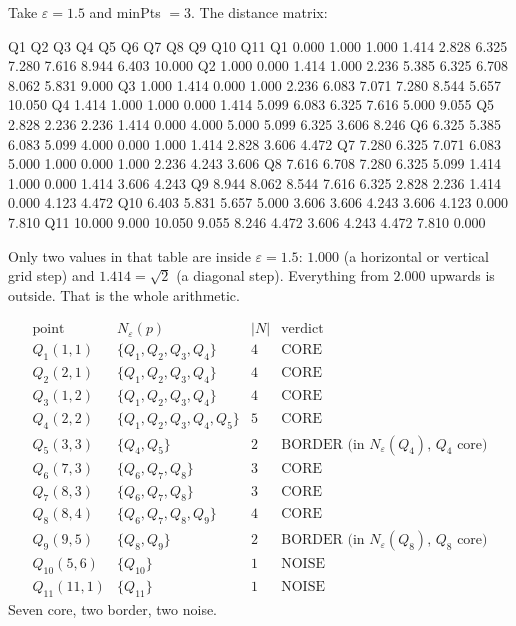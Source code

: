\documentclass[11pt]{article}
\begin{document}
Take $\varepsilon = 1.5$ and minPts $= 3$. The distance matrix:

\begin{codeout}
          Q1     Q2     Q3     Q4     Q5     Q6     Q7     Q8     Q9    Q10    Q11
  Q1   0.000  1.000  1.000  1.414  2.828  6.325  7.280  7.616  8.944  6.403 10.000
  Q2   1.000  0.000  1.414  1.000  2.236  5.385  6.325  6.708  8.062  5.831  9.000
  Q3   1.000  1.414  0.000  1.000  2.236  6.083  7.071  7.280  8.544  5.657 10.050
  Q4   1.414  1.000  1.000  0.000  1.414  5.099  6.083  6.325  7.616  5.000  9.055
  Q5   2.828  2.236  2.236  1.414  0.000  4.000  5.000  5.099  6.325  3.606  8.246
  Q6   6.325  5.385  6.083  5.099  4.000  0.000  1.000  1.414  2.828  3.606  4.472
  Q7   7.280  6.325  7.071  6.083  5.000  1.000  0.000  1.000  2.236  4.243  3.606
  Q8   7.616  6.708  7.280  6.325  5.099  1.414  1.000  0.000  1.414  3.606  4.243
  Q9   8.944  8.062  8.544  7.616  6.325  2.828  2.236  1.414  0.000  4.123  4.472
  Q10  6.403  5.831  5.657  5.000  3.606  3.606  4.243  3.606  4.123  0.000  7.810
  Q11 10.000  9.000 10.050  9.055  8.246  4.472  3.606  4.243  4.472  7.810  0.000
\end{codeout}

Only two values in that table are inside $\varepsilon = 1.5$: $1.000$ (a
horizontal or vertical grid step) and $1.414 = \sqrt{2}$ (a diagonal step).
Everything from $2.000$ upwards is outside. That is the whole arithmetic.

\begin{worked}
\[
\begin{array}{llrl}
  \text{point} & N_\varepsilon(p) & |N| & \text{verdict}\\[2pt]
  Q_1(1,1) & \{Q_1,Q_2,Q_3,Q_4\} & 4 & \text{CORE}\\
  Q_2(2,1) & \{Q_1,Q_2,Q_3,Q_4\} & 4 & \text{CORE}\\
  Q_3(1,2) & \{Q_1,Q_2,Q_3,Q_4\} & 4 & \text{CORE}\\
  Q_4(2,2) & \{Q_1,Q_2,Q_3,Q_4,Q_5\} & 5 & \text{CORE}\\
  Q_5(3,3) & \{Q_4,Q_5\} & 2 & \text{BORDER (in } N_\varepsilon(Q_4)
     \text{, } Q_4 \text{ core)}\\
  Q_6(7,3) & \{Q_6,Q_7,Q_8\} & 3 & \text{CORE}\\
  Q_7(8,3) & \{Q_6,Q_7,Q_8\} & 3 & \text{CORE}\\
  Q_8(8,4) & \{Q_6,Q_7,Q_8,Q_9\} & 4 & \text{CORE}\\
  Q_9(9,5) & \{Q_8,Q_9\} & 2 & \text{BORDER (in } N_\varepsilon(Q_8)
     \text{, } Q_8 \text{ core)}\\
  Q_{10}(5,6) & \{Q_{10}\} & 1 & \text{NOISE}\\
  Q_{11}(11,1) & \{Q_{11}\} & 1 & \text{NOISE}
\end{array}
\]
Seven core, two border, two noise.
\end{worked}
\end{document}

